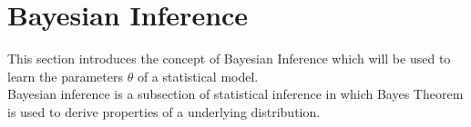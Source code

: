 \section{Bayesian Inference}
This section introduces the concept of Bayesian Inference which will be used to learn the parameters $\theta$ of a statistical model. \\
Bayesian inference is a subsection of statistical inference in which Bayes Theorem
is used to derive properties of a underlying distribution. 
 

